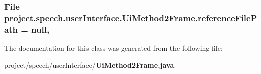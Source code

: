 \subsubsection[{reference\+File\+Path}]{\setlength{\rightskip}{0pt plus 5cm}File project.\+speech.\+user\+Interface.\+Ui\+Method2\+Frame.\+reference\+File\+Path = null\hspace{0.3cm}{\ttfamily [static]}, {\ttfamily [private]}}\label{classproject_1_1speech_1_1user_interface_1_1_ui_method2_frame_adb4febf0ccfe74b564282cfeb530e5df}


The documentation for this class was generated from the following file\+:\begin{DoxyCompactItemize}
\item 
project/speech/user\+Interface/{\bf Ui\+Method2\+Frame.\+java}\end{DoxyCompactItemize}
